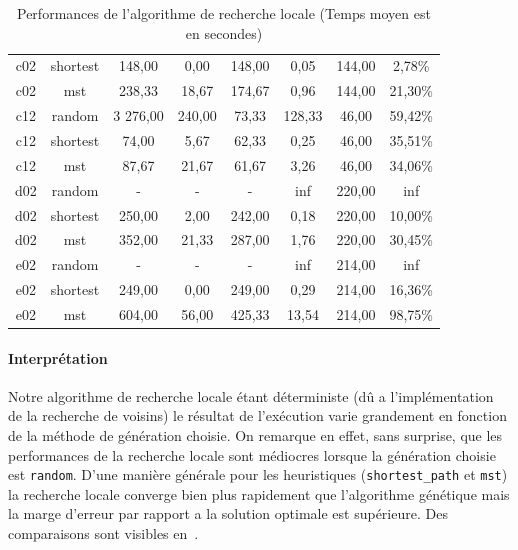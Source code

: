 \documentclass[10pt]{article}
\begin{document}
\begin{table}[h!]
\begin{tabular}{|c|c|c|c|c|c|c|c|}
\rowcolor{yellow!60} c02 & shortest & 148,00 & 0,00 & 148,00 & 0,05 & 144,00 & 2,78\% \\
c02 & mst & 238,33 & 18,67 & 174,67 & 0,96 & 144,00 & 21,30\% \\
\hline
c12 & random & 3 276,00 & 240,00 & 73,33 & 128,33 & 46,00 & 59,42\% \\
c12 & shortest & 74,00 & 5,67 & 62,33 & 0,25 & 46,00 & 35,51\% \\
\rowcolor{yellow!60} c12 & mst & 87,67 & 21,67 & 61,67 & 3,26 & 46,00 & 34,06\% \\
\hline
d02 & random & - & - & - & inf & 220,00 & inf \\
\rowcolor{yellow!60} d02 & shortest & 250,00 & 2,00 & 242,00 & 0,18 & 220,00 & 10,00\% \\
d02 & mst & 352,00 & 21,33 & 287,00 & 1,76 & 220,00 & 30,45\% \\
\hline
e02 & random & - & - & - & inf & 214,00 & inf \\
\rowcolor{yellow!60} e02 & shortest & 249,00 & 0,00 & 249,00 & 0,29 & 214,00 & 16,36\% \\
e02 & mst & 604,00 & 56,00 & 425,33 & 13,54 & 214,00 & 98,75\% \\
\hline
		\end{tabular}
		\caption{Performances de l'algorithme de recherche locale (Temps moyen est en secondes)}
		\label{tab-perfls}
	\end{table}
	
	\paragraph{Interprétation} 
Notre algorithme de recherche locale étant déterministe (dû a l'implémentation de la recherche de voisins) le résultat de l'exécution varie grandement en fonction de la méthode de génération choisie. On remarque en effet, sans surprise, que les performances de la recherche locale sont médiocres lorsque la génération choisie est \texttt{random}. D'une manière générale pour les heuristiques (\texttt{shortest\_path} et \texttt{mst}) la recherche locale converge bien plus rapidement que l'algorithme génétique mais la marge d'erreur par rapport a la solution optimale est supérieure. Des comparaisons sont visibles en~.
	
\end{document}
